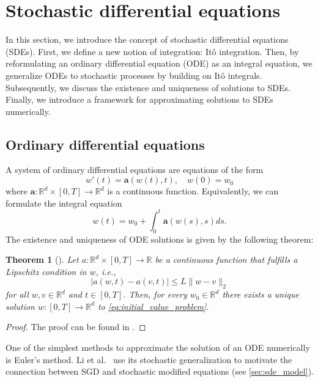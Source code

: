 \documentclass[12pt]{article}
\newtheorem{theorem}{Theorem}[section]
\theoremstyle{definition}
\numberwithin{equation}{section}
\newcommand{\R}{\mathbb{R}}
\newcommand{\norm}[1]{\lVert{#1}\rVert_2}
\begin{document}
\section{Stochastic differential equations}
\label{sec:BackgroundSDETheory}
In this section, we introduce the concept of stochastic differential equations (SDEs). First, we define a new notion of integration: Itô integration. Then, by reformulating an ordinary differential equation (ODE) as an integral equation, we generalize ODEs to stochastic processes by building on Itô integrals. Subsequently, we discuss the existence and uniqueness of solutions to SDEs. Finally, we introduce a framework for approximating solutions to SDEs numerically.
\subsection{Ordinary differential equations}
A system of ordinary differential equations are equations of the form
\begin{equation}
  \label{eq:initial_value_problem}
  w'(t) = \mathbf{a}(w(t),t), \quad w(0) = w_0
\end{equation}
where $\mathbf{a} : \R^d \times [0,T] \rightarrow \R^d$ is a continuous function. Equivalently, we can formulate the integral equation
\begin{equation}
  w(t) = w_0 + \int_0^t \mathbf{a}(w(s),s)ds.
\end{equation}
The existence and uniqueness of ODE solutions is given by the following theorem:
\begin{theorem}[]
  \label{thm:ode_existence}
  Let $a : \R^d \times [0,T] \rightarrow \R$ be a continuous function that fulfills a Lipschitz condition in $w$, i.e.,
  \begin{equation*}
    \lvert a(w,t) - a(v,t) \rvert \leq L \norm{w - v}
  \end{equation*}
  for all $w,v \in \R^d$ and $t \in [0,T]$. Then, for every $w_0 \in \R^d$ there exists a unique solution $w:[0,T] \rightarrow \R^d$ to \eqref{eq:initial_value_problem}.
\end{theorem}
\begin{proof}
  The proof can be found in .
\end{proof}
One of the simplest methods to approximate the solution of an ODE numerically is Euler's method. Li et al.\ \cite{liStochasticModifiedEquations2019} use its stochastic generalization to motivate the connection between SGD and stochastic modified equations (see \autoref{sec:sde_model}).
\end{document}
